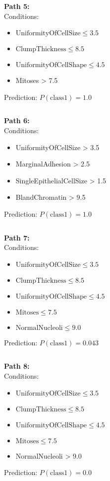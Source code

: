 \documentclass[12pt]{article}
\begin{document}
\[\quad\]

\textbf{Path 5:} \\
Conditions:
\begin{itemize}
\item $\mbox{UniformityOfCellSize} \leq 3.5$
\item $\mbox{ClumpThickness} \leq 8.5$
\item $\mbox{UniformityOfCellShape} \leq 4.5$
\item \mbox{Mitoses} > 7.5
\end{itemize}
Prediction: $P(\mbox{class} 1) = 1.0$

\[\quad\]

\textbf{Path 6:} \\
Conditions:
\begin{itemize}
\item \mbox{UniformityOfCellSize} > 3.5
\item \mbox{MarginalAdhesion} > 2.5
\item \mbox{SingleEpithelialCellSize} > 1.5
\item \mbox{BlandChromatin} > 9.5
\end{itemize}
Prediction: $P(\mbox{class} 1) = 1.0$

\[\quad\]

\textbf{Path 7:} \\
Conditions:
\begin{itemize}
\item $\mbox{UniformityOfCellSize} \leq 3.5$
\item $\mbox{ClumpThickness} \leq 8.5$
\item $\mbox{UniformityOfCellShape} \leq 4.5$
\item $\mbox{Mitoses} \leq 7.5$
\item $\mbox{NormalNucleoli} \leq 9.0$
\end{itemize}
Prediction: $P(\mbox{class} 1) = 0.043$

\[\quad\]

\textbf{Path 8:} \\
Conditions:
\begin{itemize}
\item $\mbox{UniformityOfCellSize} \leq 3.5$
\item $\mbox{ClumpThickness} \leq 8.5$
\item $\mbox{UniformityOfCellShape} \leq 4.5$
\item $\mbox{Mitoses} \leq 7.5$
\item \mbox{NormalNucleoli} > 9.0
\end{itemize}
Prediction: $P(\mbox{class} 1) = 0.0$
\end{document}
